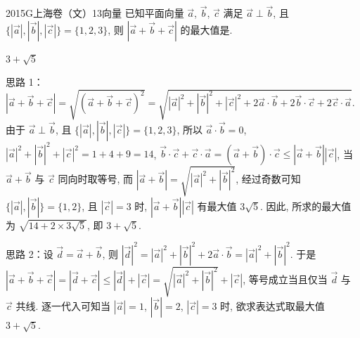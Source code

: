 
\begin{problem}{2015}{G}{上海卷（文）}{13}{向量}
已知平面向量 $ \vec{a} $, $ \vec{b} $, $ \vec{c} $ 满足 $ \vec{a}\perp\vec{b} $, 且 $ \{|\vec{a}|,|\vec{b}|,|\vec{c}|\}=\{1,2,3\} $, 则 $ |\vec{a}+\vec{b}+\vec{c}| $ 的最大值是\underline{\hspace{4em}}.
\end{problem}

\begin{answer}
$ 3+\sqrt{5} $
\end{answer}

\begin{solutions}
思路 1：$ |\vec{a}+\vec{b}+\vec{c}|=\sqrt{(\vec{a}+\vec{b}+\vec{c})^{2}}=\sqrt{|\vec{a}|^{2}+|\vec{b}|^{2}+|\vec{c}|^{2}+2\vec{a}\cdot\vec{b}+2\vec{b}\cdot\vec{c}+2\vec{c}\cdot\vec{a}} $.  
由于 $ \vec{a}\perp\vec{b} $, 且 $ \{|\vec{a}|,|\vec{b}|,|\vec{c}|\}=\{1,2,3\} $, 所以 $ \vec{a}\cdot\vec{b}=0 $, $ |\vec{a}|^{2}+|\vec{b}|^{2}+|\vec{c}|^{2}=1+4+9=14 $,  
$ \vec{b}\cdot\vec{c}+\vec{c}\cdot\vec{a}=(\vec{a}+\vec{b})\cdot\vec{c}\leqslant|\vec{a}+\vec{b}||\vec{c}| $, 当 $ \vec{a}+\vec{b} $ 与 $ \vec{c} $ 同向时取等号, 而 $ |\vec{a}+\vec{b}|=\sqrt{|\vec{a}|^{2}+|\vec{b}|^{2}} $, 经过奇数可知 $ \{|\vec{a}|,|\vec{b}|\}=\{1,2\} $, 且 $ |\vec{c}|=3 $ 时, $ |\vec{a}+\vec{b}||\vec{c}| $ 有最大值 $ 3\sqrt{5} $. 因此, 所求的最大值为 $ \sqrt{14+2\times3\sqrt{5}} $, 即 $ 3+\sqrt{5} $.  

思路 2：设 $ \vec{d}=\vec{a}+\vec{b} $, 则 $ |\vec{d}|^{2}=|\vec{a}|^{2}+|\vec{b}|^{2}+2\vec{a}\cdot\vec{b}=|\vec{a}|^{2}+|\vec{b}|^{2} $.  
于是 $ |\vec{a}+\vec{b}+\vec{c}|=|\vec{d}+\vec{c}|\leqslant|\vec{d}|+|\vec{c}|=\sqrt{|\vec{a}|^{2}+|\vec{b}|^{2}}+|\vec{c}| $,  
等号成立当且仅当 $ \vec{d} $ 与 $ \vec{c} $ 共线. 逐一代入可知当 $ |\vec{a}|=1 $, $ |\vec{b}|=2 $, $ |\vec{c}|=3 $ 时, 欲求表达式取最大值 $ 3+\sqrt{5} $.
\end{solutions}
